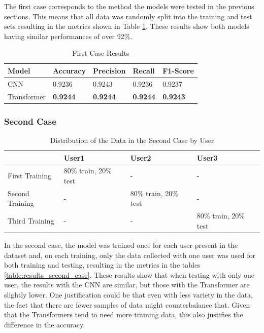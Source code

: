 The first case corresponds to the method the models were tested in the previous sections. This means that all data was randomly split into the training and test sets resulting in the metrics shown in Table \ref{table:results_first_case}. These results show both models having similar performances of over 92\%.

\begin{table}[H]
    \centering
    \caption{First Case Results}
    \label{table:results_first_case}
    \begin{tabular}{|l|l|l|l|l|}
        \hline
        Model & Accuracy & Precision & Recall & F1-Score \\
        \hline
        CNN & 0.9236 & 0.9243 & 0.9236 & 0.9237 \\
        \hline
        Transformer & \textbf{0.9244} & \textbf{0.9244} & \textbf{0.9244} & \textbf{0.9243} \\
        \hline
    \end{tabular}
\end{table}

\subsubsection{Second Case}

\begin{table}[H]
    \centering
    \caption{Distribution of the Data in the Second Case by User}
    \label{table:data_distribution_second_case}
    \begin{tabular}{|l|l|l|l|}
        \hline
        & User1 & User2 & User3 \\
        \hline
        First Training & 80\% train, 20\% test & - & - \\
        \hline
        Second Training & - & 80\% train, 20\% test & - \\
        \hline
        Third Training & - & - & 80\% train, 20\% test \\
        \hline
    \end{tabular}
\end{table}

In the second case, the model was trained once for each user present in the dataset and, on each training, only the data collected with one user was used for both training and testing, resulting in the metrics in the tables \ref{table:results_second_case}. These results show that when testing with only one user, the results with the CNN are similar, but those with the Transformer are slightly lower. One justification could be that even with less variety in the data, the fact that there are fewer samples of data might counterbalance that. Given that the Transformers tend to need more training data, this also justifies the difference in the accuracy.

